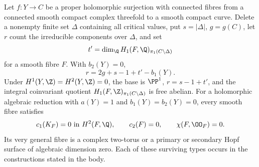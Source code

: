 \begin{maintheorem}
\hypertarget{tag-03K3}{}\label{series:II:B}

Let $f:Y\to C$ be a proper holomorphic surjection with connected
fibres from a connected smooth compact complex threefold to a
smooth compact curve. Delete a nonempty finite set $\Delta$
containing all critical values, put $s=|\Delta|$, $g=g(C)$,
let $r$ count the irreducible components over $\Delta$, and set
\[
 t'=\dim_\Q H_1(F,\Q)_{\pi_1(C\setminus\Delta)}
\]
for a smooth fibre $F$. With $b_2(Y)=0$,
\[
 r=2g+s-1+t'-b_1(Y).
\]
Under $H^1(Y,\Z)=H^2(Y,\Z)=0$, the base is $\PP^1$,
$r=s-1+t'$, and the integral coinvariant quotient
$H_1(F,\Z)_{\pi_1(C\setminus\Delta)}$ is free abelian.
For a holomorphic algebraic reduction with $a(Y)=1$ and
$b_1(Y)=b_2(Y)=0$, every smooth fibre satisfies
\[
 c_1(K_F)=0\text{ in }H^2(F,\Q),\qquad
 c_2(F)=0,\qquad \chi(F,\OO_F)=0.
\]
Its very general fibre is a complex two-torus or a primary or
secondary Hopf surface of algebraic dimension zero. Each of these
surviving types occurs in the constructions stated in the body.

\end{maintheorem}
